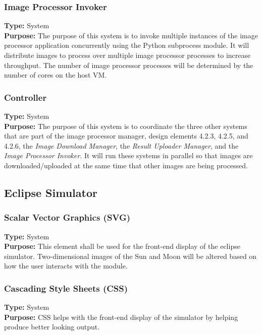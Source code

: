 \documentclass[10pt, onecolumn, draftclsnofoot, letterpaper, compsoc]{IEEEtran}
\begin{document}
    \subsubsection{Image Processor Invoker}
    \textbf{Type:} System \\
    \textbf{Purpose:} The purpose of this system is to invoke multiple instances of the image processor 
    application concurrently using the Python subprocess module. It will distribute images to process over 
    multiple image processor processes to increase throughput. The number of image processor processes will be 
    determined by the number of cores on the host VM. \\

    \subsubsection{Controller}
    \textbf{Type:} System \\
    \textbf{Purpose:} The purpose of this system is to coordinate the three other systems that are part of the 
    image processor manager, design elements 4.2.3, 4.2.5, and 4.2.6, the \textit{Image Download Manager}, 
    the \textit{Result Uploader Manager}, and the \textit{Image Processor Invoker}. It will run these systems
    in parallel so that images are downloaded/uploaded at the same time that other images are being 
    processed. \\


\subsection{Eclipse Simulator}

  \subsubsection{Scalar Vector Graphics (SVG)}
  \textbf{Type:} System \\
  \textbf{Purpose:} This element shall be used for the
  front-end display of the eclipse simulator.
  Two-dimensional images of the Sun and Moon will be altered
  based on how the user interacts with the module.


  \subsubsection{Cascading Style Sheets (CSS)}
  \textbf{Type:} System \\
  \textbf{Purpose:} CSS helps with the front-end display of
  the simulator by helping produce better looking output.
\end{document}

